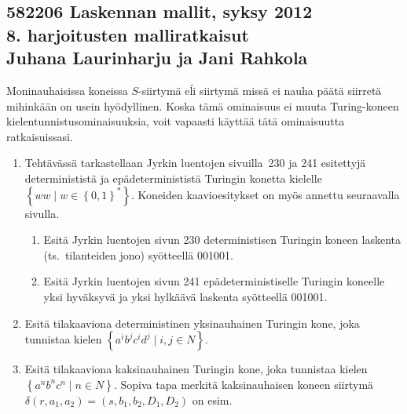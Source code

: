 \documentclass[finnish,11pt,draft]{article}
\newcommand{\set}[1]{{\left\{ #1 \right\}}}
\begin{document}
\subsection*{582206 Laskennan mallit, syksy 2012 \\
  \textmd{8. harjoitusten malliratkaisut \\
    Juhana Laurinharju ja Jani Rahkola}}

Moninauhaisissa koneissa $S$-siirtymä eĺi siirtymä missä ei nauha päätä
siirretä mihinkään on usein hyödyllinen. Koska tämä ominaisuus ei muuta
Turing-koneen kielentunnistusominaisuuksia, voit vapaasti käyttää tätä
ominaisuutta ratkaisuissasi.

\begin{enumerate}
\item
  Tehtävässä tarkastellaan Jyrkin luentojen sivuilla~230 ja 241 esitettyjä
  determinististä ja epädeterminististä Turingin konetta kielelle $\set{ww\mid
    w\in\set{0,1}^\ast}$. Koneiden kaavioesitykset on myös annettu seuraavalla
  sivulla.
\begin{enumerate}
\item
Esitä Jyrkin luentojen sivun 230 deterministisen Turingin koneen
laskenta (ts.\ tilanteiden jono) syötteellä 001001.
\item
Esitä Jyrkin luentojen sivun 241 epädeterministiselle Turingin koneelle
yksi hyväksyvä ja yksi hylkäävä laskenta
syötteellä 001001.
\end{enumerate}

\item
Esitä tilakaaviona deterministinen yksinauhainen
Turingin kone, joka tunnistaa kielen
$\set{a^ib^jc^id^j\mid i,j\in N}$.




\item
Esitä tilakaaviona kaksinauhainen Turingin kone, joka tunnistaa
kielen $\set{a^nb^nc^n\mid n\in N}$.
Sopiva tapa merkitä kaksinauhaisen koneen siirtymä
$\delta(r,a_1,a_2)=(s,b_1,b_2,D_1,D_2)$ on esim.
\newcommand{\twotrans}
{\left[\begin{array}{c}
a_1\rightarrow b_1,D_1\\
a_2\rightarrow b_2,D_2
\end{array}\right]}
\bigskip


\newcommand{\doubletrans}[6]
{$\left[\begin{array}{c}\trans{#1}{#2}{#3} \\ \trans{#4}{#5}{#6}\end{array}\right]$}


\end{enumerate}
\end{document}
